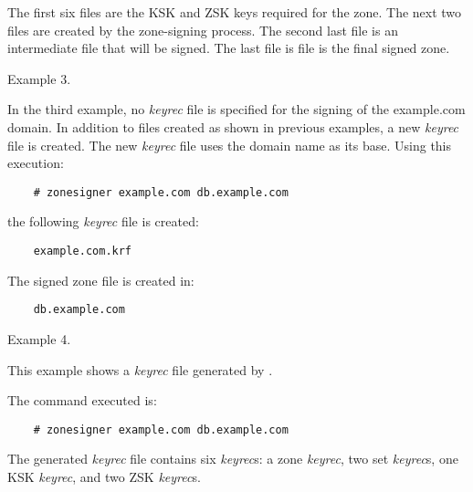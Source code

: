 The first six files are the KSK and ZSK keys required for the zone.  The next
two files are created by the zone-signing process.  The second last file is
an intermediate file that will be signed.  The last file is file is the final
signed zone.

Example 3.

In the third example, no {\it keyrec} file is specified for the signing of the
example.com domain.  In addition to files created as shown in previous
examples, a new {\it keyrec} file is created.  The new {\it keyrec} file uses
the domain name as its base.  Using this execution:

\begin{verbatim}
    # zonesigner example.com db.example.com
\end{verbatim}

the following {\it keyrec} file is created:

\begin{verbatim}
    example.com.krf
\end{verbatim}

The signed zone file is created in:

\begin{verbatim}
    db.example.com
\end{verbatim}

Example 4.

This example shows a {\it keyrec} file generated by .

The command executed is:

\begin{verbatim}
    # zonesigner example.com db.example.com
\end{verbatim}

The generated {\it keyrec} file contains six {\it keyrec}s:  a zone
{\it keyrec}, two set {\it keyrec}s, one KSK {\it keyrec}, and two ZSK
{\it keyrec}s.

